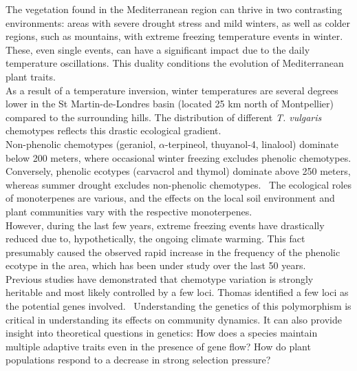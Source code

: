 The vegetation found in the Mediterranean region can thrive in two contrasting environments: areas with severe drought stress and mild winters, as well as colder regions, such as mountains, with extreme freezing temperature events in winter. These, even single events, can have a significant impact due to the daily temperature oscillations. This duality conditions the evolution of Mediterranean plant traits.~\cite{thompsonBibliography2020}\\

As a result of a temperature inversion, winter temperatures are several degrees lower in the St Martin-de-Londres basin (located 25 km north of Montpellier) compared to the surrounding hills. The distribution of different \textit{T. vulgaris} chemotypes reflects this drastic ecological gradient.~\cite{thompsonBibliography2020,bataillonGenotypePhenotypeGenetic2022} \\

Non-phenolic chemotypes (geraniol, $\alpha$-terpineol, thuyanol-4, linalool) dominate below 200 meters, where occasional winter freezing excludes phenolic chemotypes. Conversely, phenolic ecotypes (carvacrol and thymol) dominate above 250 meters, whereas summer drought excludes non-phenolic chemotypes.~\cite{thompsonBibliography2020} The ecological roles of monoterpenes are various, and the effects on the local soil environment and plant communities vary with the respective monoterpenes.~\cite{bataillonGenotypePhenotypeGenetic2022} \\

However, during the last few years, extreme freezing events have drastically reduced due to, hypothetically, the ongoing climate warming. This fact presumably caused the observed rapid increase in the frequency of the phenolic ecotype in the area, which has been under study over the last 50 years.~\cite{thompsonBibliography2020,bataillonGenotypePhenotypeGenetic2022} \\

Previous studies have demonstrated that chemotype variation is strongly heritable and most likely controlled by a few loci. Thomas \etal identified a few loci as the potential genes involved.~\cite{bataillonGenotypePhenotypeGenetic2022}   Understanding the genetics of this polymorphism is critical in understanding its effects on community dynamics. It can also provide insight into theoretical questions in genetics: How does a species maintain multiple adaptive traits even in the presence of gene flow? How do plant populations respond to a decrease in strong selection pressure?~\cite{bataillonGenotypePhenotypeGenetic2022}\\

